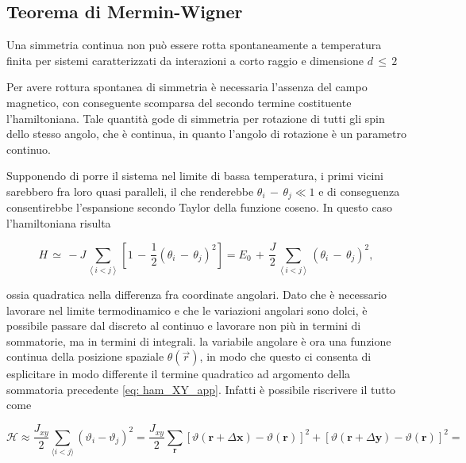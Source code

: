 \subsection{Teorema di Mermin-Wigner}

\begin{theorem}
    Una simmetria continua non può essere rotta spontaneamente a temperatura finita per sistemi caratterizzati da 
    interazioni a corto raggio e dimensione $d\,\leq\,2$
\end{theorem}

Per avere rottura spontanea di simmetria è necessaria l'assenza del campo magnetico, con conseguente scomparsa del secondo termine 
costituente l'hamiltoniana. Tale quantità gode di simmetria per rotazione di tutti gli spin dello stesso angolo, che è continua, 
in quanto l'angolo di rotazione è un parametro continuo.

Supponendo di porre il sistema nel limite di bassa temperatura, i primi vicini sarebbero fra loro quasi 
paralleli, il che renderebbe $\theta_i\,-\,\theta_j \ll 1$ e di conseguenza consentirebbe l'espansione secondo Taylor della funzione 
coseno. In questo caso l'hamiltoniana risulta 

\begin{equation}
    H\,\simeq\,-J\sum_{\left<i<j\right>}\left[1\,-\,\frac{1}{2}\left(\theta_i\,-\,\theta_j\right)^2\right] = E_0\,+\,\frac{J}{2}\sum_{\left<i<j\right>}\left(\theta_i\,-\,\theta_j\right)^2,  
    \label{eq: ham_XY_app}
\end{equation}

ossia quadratica nella differenza fra coordinate angolari. Dato che è necessario lavorare nel limite termodinamico e che le variazioni 
angolari sono dolci, è possibile passare dal discreto al continuo e lavorare non più in termini di sommatorie, ma in termini di integrali.
la variabile angolare è ora una funzione continua della posizione spaziale $\theta\left(\vec{r}\right)$, in modo che questo ci consenta di 
esplicitare in modo differente il termine quadratico ad argomento della sommatoria precedente \eqref{eq: ham_XY_app}. Infatti è 
possibile riscrivere il tutto come

\begin{equation}
    \mathcal{H} \approx \frac{J_{xy}}{2} \sum_{\langle i<j \rangle} \left( \vartheta_i - \vartheta_j \right)^2 = \frac{J_{xy}}{2} \sum_{\mathbf{r}} \left[ \vartheta (\mathbf{r} + \Delta \mathbf{x}) - \vartheta (\mathbf{r}) \right]^2 
    + \left[ \vartheta (\mathbf{r} + \Delta \mathbf{y}) - \vartheta (\mathbf{r}) \right]^2 = 
    \label{eq: ham_XY_SW}
\end{equation}

